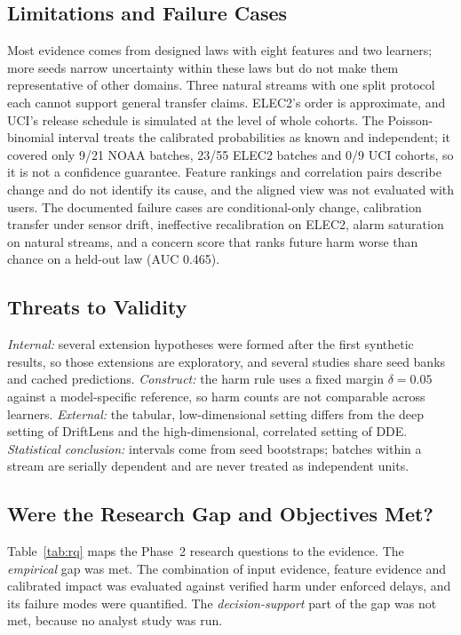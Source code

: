 \subsection{Limitations and Failure Cases}
Most evidence comes from designed laws with eight features and two learners; more
seeds narrow uncertainty within these laws but do not make them representative of
other domains. Three natural streams with one split protocol each cannot support
general transfer claims. ELEC2's order is approximate, and UCI's release schedule is
simulated at the level of whole cohorts. The Poisson-binomial interval treats the
calibrated probabilities as known and independent; it covered only 9/21 NOAA batches,
23/55 ELEC2 batches and 0/9 UCI cohorts, so it is not a confidence guarantee. Feature
rankings and correlation pairs describe change and do not identify its cause, and the
aligned view was not evaluated with users. The documented failure cases are
conditional-only change, calibration transfer under sensor drift, ineffective
recalibration on ELEC2, alarm saturation on natural streams, and a concern score that
ranks future harm worse than chance on a held-out law (AUC 0.465).

\subsection{Threats to Validity}
\emph{Internal:} several extension hypotheses were formed after the first synthetic
results, so those extensions are exploratory, and several studies share seed banks
and cached predictions. \emph{Construct:} the harm rule uses a fixed margin
$\delta=0.05$ against a model-specific reference, so harm counts are not comparable
across learners. \emph{External:} the tabular, low-dimensional setting differs from
the deep setting of DriftLens and the high-dimensional, correlated setting of DDE.
\emph{Statistical conclusion:} intervals come from seed bootstraps; batches within a
stream are serially dependent and are never treated as independent units.

\subsection{Were the Research Gap and Objectives Met?}
Table~\ref{tab:rq} maps the Phase~2 research questions to the evidence. The
\emph{empirical} gap was met. The combination of input evidence, feature evidence and
calibrated impact was evaluated against verified harm under enforced delays, and its
failure modes were quantified. The \emph{decision-support} part of the gap was not met,
because no analyst study was run.

